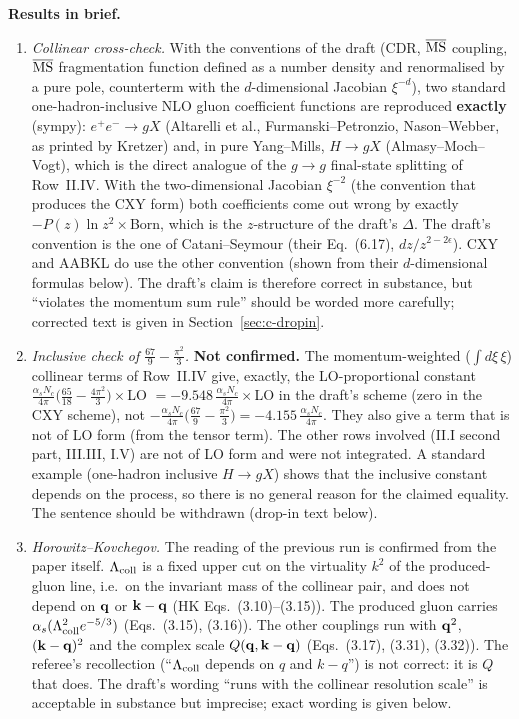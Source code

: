 \medskip
\noindent\textbf{Results in brief.}
\begin{enumerate}
\item[(a)] \emph{Collinear cross-check.} With the conventions of the draft (CDR, $\overline{\rm MS}$ coupling, $\overline{\rm MS}$ fragmentation function defined as a number density and renormalised by a pure pole, counterterm with the $d$-dimensional Jacobian $\xi^{-d}$), two standard one-hadron-inclusive NLO gluon coefficient functions are reproduced \textbf{exactly} (sympy): $e^+e^-\to gX$ (Altarelli et al., Furmanski--Petronzio, Nason--Webber, as printed by Kretzer) and, in pure Yang--Mills, $H\to gX$ (Almasy--Moch--Vogt), which is the direct analogue of the $g\to g$ final-state splitting of Row~II.IV. With the two-dimensional Jacobian $\xi^{-2}$ (the convention that produces the CXY form) both coefficients come out wrong by exactly $-P(z)\ln z^2\times$Born, which is the $z$-structure of the draft's $\Delta$. The draft's convention is the one of Catani--Seymour (their Eq.~(6.17), $dz/z^{2-2\epsilon}$). CXY and AABKL do use the other convention (shown from their $d$-dimensional formulas below). The draft's claim is therefore correct in substance, but ``violates the momentum sum rule'' should be worded more carefully; corrected text is given in Section~\ref{sec:c-dropin}.
\item[(b)] \emph{Inclusive check of $\frac{67}{9}-\frac{\pi^2}{3}$.} \textbf{Not confirmed.} The momentum-weighted ($\int d\xi\,\xi$) collinear terms of Row~II.IV give, exactly, the LO-proportional constant $\frac{\alpha_sN_c}{4\pi}\big(\frac{65}{18}-\frac{4\pi^2}{3}\big)\times$LO $=-9.548\,\frac{\alpha_sN_c}{4\pi}\times$LO in the draft's scheme (zero in the CXY scheme), not $-\frac{\alpha_sN_c}{4\pi}\big(\frac{67}{9}-\frac{\pi^2}{3}\big)=-4.155\,\frac{\alpha_sN_c}{4\pi}$. They also give a term that is not of LO form (from the tensor term). The other rows involved (II.I second part, III.III, I.V) are not of LO form and were not integrated. A standard example (one-hadron inclusive $H\to gX$) shows that the inclusive constant depends on the process, so there is no general reason for the claimed equality. The sentence should be withdrawn (drop-in text below).
\item[(c)] \emph{Horowitz--Kovchegov.} The reading of the previous run is confirmed from the paper itself. $\Lambda_{\rm coll}$ is a fixed upper cut on the virtuality $k^2$ of the produced-gluon line, i.e.\ on the invariant mass of the collinear pair, and does not depend on $\mathbf{q}$ or $\mathbf{k}-\mathbf{q}$ (HK Eqs.~(3.10)--(3.15)). The produced gluon carries $\alpha_s(\Lambda^2_{\rm coll}e^{-5/3})$ (Eqs.~(3.15), (3.16)). The other couplings run with $\mathbf{q}^2$, $(\mathbf{k}-\mathbf{q})^2$ and the complex scale $Q(\mathbf{q},\mathbf{k}-\mathbf{q})$ (Eqs.~(3.17), (3.31), (3.32)). The referee's recollection (``$\Lambda_{\rm coll}$ depends on $q$ and $k-q$'') is not correct: it is $Q$ that does. The draft's wording ``runs with the collinear resolution scale'' is acceptable in substance but imprecise; exact wording is given below.
\end{enumerate}

